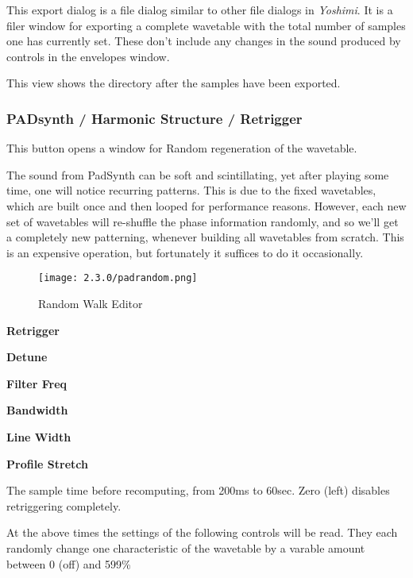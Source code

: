    This export dialog is a file dialog similar to other file dialogs
   in \textsl{Yoshimi}.
   It is a filer window for exporting a complete wavetable with the total number
   of samples one has currently set. These don't include any changes in the
   sound produced by controls in the envelopes window.

   This view shows the directory after the samples have been exported.

\subsubsection{PADsynth / Harmonic Structure / Retrigger}
\label{subsubsec:padsynth_harmonic_structure_retrigger}
   This button opens a window for Random regeneration of the wavetable.

   The sound from PadSynth can be soft and scintillating, yet after playing some
   time, one will notice recurring patterns. This is due to the fixed
   wavetables, which are built once and then looped for performance reasons.
   However, each new set of wavetables will re-shuffle the phase information
   randomly, and so we'll get a completely new patterning, whenever building all
   wavetables from scratch. This is an expensive operation, but fortunately it
   suffices to do it occasionally.

\begin{figure}[H]
   \centering
   \texttt{[image: 2.3.0/padrandom.png]}
   \caption{Random Walk Editor}
   \label{fig:padsynth_random_walk_editor}
\end{figure}

   \begin{enumber}
      \item \textbf{Retrigger}
      \item \textbf{Detune}
      \item \textbf{Filter Freq}
      \item \textbf{Bandwidth}
      \item \textbf{Line Width}
      \item \textbf{Profile Stretch}
   \end{enumber}

   \setcounter{ItemCounter}{0}      %
    {} The sample time before recomputing, from 200ms to
   60sec. Zero (left) disables retriggering completely.

   At the above times the settings of the following controls will be read. They
   each randomly change one characteristic of the wavetable by a varable amount
   between 0 (off) and 599\%

